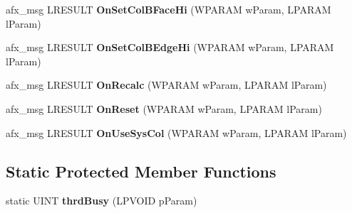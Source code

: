 \begin{DoxyCompactItemize}
\item 
\hypertarget{class_cx_prog_ctrl_a4e478f9f6d59e0c9452a1951bd16048f}{afx\-\_\-msg L\-R\-E\-S\-U\-L\-T {\bfseries On\-Set\-Col\-B\-Face\-Hi} (W\-P\-A\-R\-A\-M w\-Param, L\-P\-A\-R\-A\-M l\-Param)}\label{class_cx_prog_ctrl_a4e478f9f6d59e0c9452a1951bd16048f}

\item 
\hypertarget{class_cx_prog_ctrl_ab095909bd0e41b9b01260bdd6192d5d5}{afx\-\_\-msg L\-R\-E\-S\-U\-L\-T {\bfseries On\-Set\-Col\-B\-Edge\-Hi} (W\-P\-A\-R\-A\-M w\-Param, L\-P\-A\-R\-A\-M l\-Param)}\label{class_cx_prog_ctrl_ab095909bd0e41b9b01260bdd6192d5d5}

\item 
\hypertarget{class_cx_prog_ctrl_a5b9df0d00cfe01feca6c831252473cf8}{afx\-\_\-msg L\-R\-E\-S\-U\-L\-T {\bfseries On\-Recalc} (W\-P\-A\-R\-A\-M w\-Param, L\-P\-A\-R\-A\-M l\-Param)}\label{class_cx_prog_ctrl_a5b9df0d00cfe01feca6c831252473cf8}

\item 
\hypertarget{class_cx_prog_ctrl_a56e45a2475c6dcd0fed53dd99ba8dabb}{afx\-\_\-msg L\-R\-E\-S\-U\-L\-T {\bfseries On\-Reset} (W\-P\-A\-R\-A\-M w\-Param, L\-P\-A\-R\-A\-M l\-Param)}\label{class_cx_prog_ctrl_a56e45a2475c6dcd0fed53dd99ba8dabb}

\item 
\hypertarget{class_cx_prog_ctrl_ae9054ac18a66e9f7d168d76c2781df3a}{afx\-\_\-msg L\-R\-E\-S\-U\-L\-T {\bfseries On\-Use\-Sys\-Col} (W\-P\-A\-R\-A\-M w\-Param, L\-P\-A\-R\-A\-M l\-Param)}\label{class_cx_prog_ctrl_ae9054ac18a66e9f7d168d76c2781df3a}

\end{DoxyCompactItemize}
\subsection*{Static Protected Member Functions}
\begin{DoxyCompactItemize}
\item 
\hypertarget{class_cx_prog_ctrl_a55eaeb6435c836302a535fadc69ebe5c}{static U\-I\-N\-T {\bfseries thrd\-Busy} (L\-P\-V\-O\-I\-D p\-Param)}\label{class_cx_prog_ctrl_a55eaeb6435c836302a535fadc69ebe5c}

\end{DoxyCompactItemize}
